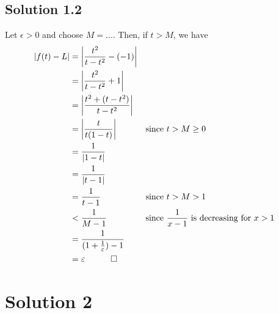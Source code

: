 \documentclass{article}
\begin{document}
\subsection*{Solution 1.2}
Let $\epsilon > 0$ and choose $M = \ldots$. Then, if $t > M$, we have
\begin{align*}
    \left| f(t) - L \right|     
    &= \left| \frac{t^2}{t-t^2} - (-1) \right| \\
    &= \left| \frac{t^2}{t-t^2} + 1 \right| \\
    &= \left| \frac{t^2+(t-t^2)}{t-t^2} \right| \\
    &= \left| \frac{t}{t(1-t)} \right| && \text{since }t > M \geq 0 \\
    &= \frac{1}{\left|1-t\right|} \\
    &= \frac{1}{\left|t-1\right|} \\
    &= \frac{1}{t-1} && \text{since } t >M > 1 \\
    &< \frac{1}{M-1} && \text{since } \frac{1}{x-1} \text{ is decreasing for } x > 1 \\
    &= \frac{1}{(1+\frac{1}{\epsilon})-1} \\
    &= \epsilon \quad \qed
\end{align*}

\section*{Solution 2}
\end{document}
